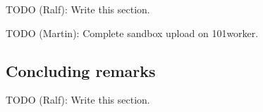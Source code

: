 \documentclass{article}
\newcommand{\todo}[2]{\noindent{}TODO (#1): #2}
\begin{document}
\todo{Ralf}{Write this section.}

\todo{Martin}{Complete sandbox upload on 101worker.}


\subsection{Concluding remarks}

\todo{Ralf}{Write this section.}


\begin{comment}

























\end{comment}
\end{document}
